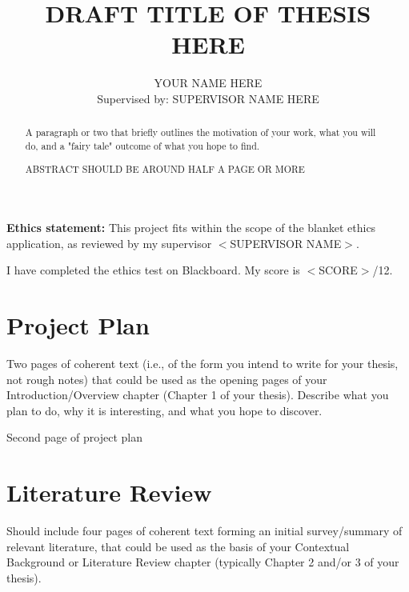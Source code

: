 \documentclass{article}
\title{DRAFT TITLE OF THESIS HERE}
\author{YOUR NAME HERE \\ 
        Supervised by: SUPERVISOR NAME HERE}
\begin{document}
\maketitle

\begin{abstract}
A paragraph or two that briefly outlines the motivation of your work, what you will do, and a "fairy tale" outcome of what you hope to find. 

\vspace{75mm} 

ABSTRACT SHOULD BE AROUND HALF A PAGE OR MORE
\end{abstract}

\textbf{Ethics statement: } This project
fits within the scope of the blanket ethics application, as reviewed by my supervisor $<$SUPERVISOR NAME$>$.

I have completed the ethics test on Blackboard. My score is $<$SCORE$>$/12.

\newpage %

\section{Project Plan}

Two pages of coherent text (i.e., of the form you intend to write for your thesis, not rough notes) that could be used as the opening pages of your Introduction/Overview chapter (Chapter 1 of your thesis). Describe what you plan to do, why it is interesting, and what you hope to discover.

\newpage

Second page of project plan

\newpage

\section{Literature Review}

Should include four pages of coherent text forming an initial survey/summary of relevant literature, that could be used as the basis of your Contextual Background or Literature Review chapter (typically Chapter 2 and/or 3 of your thesis).
\end{document}
